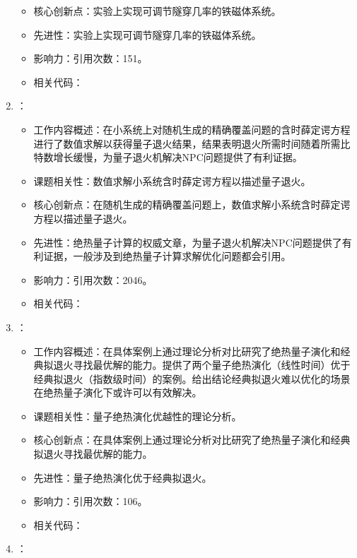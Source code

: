 \begin{enumerate}
\begin{itemize}
                \item 核心创新点：实验上实现可调节隧穿几率的铁磁体系统。
                \item 先进性：实验上实现可调节隧穿几率的铁磁体系统。
                \item 影响力：引用次数：151。
                \item 相关代码：
            \end{itemize}
        \item \citet{farhi2001quantum}：
        \begin{itemize}
            \item 工作内容概述：在小系统上对随机生成的精确覆盖问题的含时薛定谔方程进行了数值求解以获得量子退火结果，结果表明退火所需时间随着所需比特数增长缓慢，为量子退火机解决NPC问题提供了有利证据。
            \item 课题相关性：数值求解小系统含时薛定谔方程以描述量子退火。
            \item 核心创新点：在随机生成的精确覆盖问题上，数值求解小系统含时薛定谔方程以描述量子退火。
            \item 先进性：绝热量子计算的权威文章，为量子退火机解决NPC问题提供了有利证据，一般涉及到绝热量子计算求解优化问题都会引用。
            \item 影响力：引用次数：2046。
            \item 相关代码：
        \end{itemize}
        \item \citet{farhi2002quantum}：
            \begin{itemize}
                \item 工作内容概述：在具体案例上通过理论分析对比研究了绝热量子演化和经典拟退火寻找最优解的能力。提供了两个量子绝热演化（线性时间）优于经典拟退火（指数级时间）的案例。给出结论经典拟退火难以优化的场景在绝热量子演化下或许可以有效解决。
                \item 课题相关性：量子绝热演化优越性的理论分析。
                \item 核心创新点：在具体案例上通过理论分析对比研究了绝热量子演化和经典拟退火寻找最优解的能力。
                \item 先进性：量子绝热演化优于经典拟退火。
                \item 影响力：引用次数：106。
                \item 相关代码：
            \end{itemize}
            \item \citet{martovnak2002quantum}：
            \begin{itemize}

\end{itemize}
\end{enumerate}
